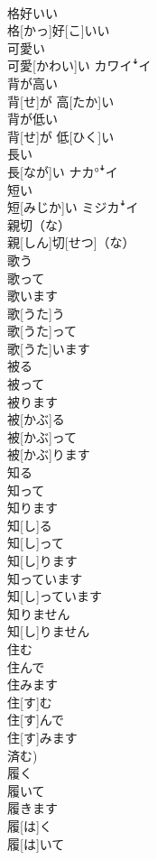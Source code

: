 \documentclass[8pt]{extreport}
\begin{document}
\begin{CJK}{UTF8}{min}
\\	格好いい	
\\	格[かっ]好[こ]いい	
\\	可愛い	
\\	可愛[かわい]い	カワイꜜイ
\\	背が高い	
\\	背[せ]が 高[たか]い	
\\	背が低い	
\\	背[せ]が 低[ひく]い	
\\	長い	
\\	長[なが]い	ナカ°ꜜイ
\\	短い	
\\	短[みじか]い	ミジカꜜイ
\\	親切（な）	
\\	親[しん]切[せつ]（な）	
\\	歌う 
\\	歌って 
\\	歌います	
\\	歌[うた]う 
\\	歌[うた]って 
\\	歌[うた]います	
\\	被る 
\\	被って 
\\	被ります	
\\	被[かぶ]る 
\\	被[かぶ]って 
\\	被[かぶ]ります	
\\	知る 
\\	知って 
\\	知ります	
\\	知[し]る 
\\	知[し]って 
\\	知[し]ります	
\\	知っています	
\\	知[し]っています	
\\	知りません	
\\	知[し]りません	
\\	住む 
\\	住んで 
\\	住みます	
\\	住[す]む 
\\	住[す]んで 
\\	住[す]みます 
\\	済む)	
\\	履く 
\\	履いて 
\\	履きます	
\\	履[は]く 
\\	履[は]いて 

\end{CJK}
\end{document}

